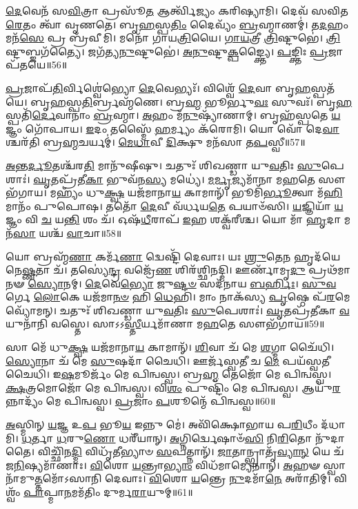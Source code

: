 \-\ul{𑌦𑍇}\-𑌵𑍇𑌨᳴ 𑌸\-\ul{𑌵𑌿}\-𑌤𑍍𑌰𑌾 𑌪𑍍𑌰𑌸𑍂᳴\-\ul{𑌤} 𑌆𑌰𑍍𑌤𑍍𑌵𑌿᳴𑌜𑍍𑌯𑌂 𑌕𑌰𑌿𑌷𑍍𑌯𑌾𑌮𑌿।
𑌦𑍇𑌵᳴ 𑌸𑌵𑌿𑌤\-\ul{𑌰𑍇}\-𑌤𑌂 𑌤𑍍𑌵𑌾᳴ 𑌵𑍃𑌣𑌤𑍇।
𑌬𑍃\-\ul{𑌹}\-𑌸𑍍𑌪\-\ul{𑌤𑌿𑌂} 𑌦𑍈𑌵𑍍𑌯𑌂᳴ \ul{𑌬𑍍𑌰}\-𑌹𑍍𑌮𑌾𑌣𑌮𑍍॑।
𑌤\-\ul{𑌦}\-𑌹𑌂 𑌮𑌨᳴\-\ul{𑌸𑍇} 𑌪𑍍𑌰 𑌬𑍍𑌰᳴𑌵𑍀𑌮𑌿।
𑌮𑌨𑍋᳴ 𑌗𑌾𑌯\-\ul{𑌤𑍍𑌰𑌿}\-𑌯𑍈।
\-\ul{𑌗𑌾}\-\-\ul{𑌯}\-𑌤𑍍𑌰𑍀 \ul{𑌤𑍍𑌰𑌿}\-𑌷𑍍𑌟𑍁𑌭𑍇॑।
\-\ul{𑌤𑍍𑌰𑌿}\-𑌷𑍍𑌟𑍁𑌬𑍍𑌜𑌗᳴𑌤𑍍𑌯𑍈।
𑌜𑌗᳴𑌤𑍍𑌯\-\ul{𑌨𑍁}\-𑌷𑍍𑌟𑍁𑌭𑍇॑।
\-\ul{𑌅}\-\-\ul{𑌨𑍁}\-𑌷𑍍𑌟𑍁\-\ul{𑌕𑍍𑌪}\-𑌙𑍍𑌕𑍍𑌤𑍍𑌯𑍈।
\-\ul{𑌪}\-𑌙𑍍𑌕𑍍𑌤𑌿𑌃 \ul{𑌪𑍍𑌰}\-𑌜𑌾𑌪᳴𑌤𑌯𑍇॥56॥

\-\ul{𑌪𑍍𑌰}\-𑌜𑌾𑌪᳴\-\ul{𑌤𑌿}\-𑌰𑍍𑌵𑌿𑌶𑍍𑌵𑍇॑𑌭𑍍𑌯𑍋 \ul{𑌦𑍇}\-𑌵𑍇𑌭𑍍𑌯𑌃᳴।
𑌵𑌿𑌶𑍍𑌵𑍇᳴ \ul{𑌦𑍇}\-𑌵𑌾 𑌬𑍃\-\ul{𑌹}\-𑌸𑍍𑌪𑌤᳴𑌯𑍇।
𑌬𑍃\-\ul{𑌹}\-𑌸𑍍𑌪\-\ul{𑌤𑌿}\-𑌰𑍍𑌬𑍍𑌰𑌹𑍍𑌮᳴𑌣𑍇।
𑌬𑍍𑌰\-\ul{𑌹𑍍𑌮} 𑌭𑍂𑌰𑍍𑌭𑍁\-\ul{𑌵𑌃} 𑌸𑍁𑌵𑌃᳴।
𑌬𑍃\-\ul{𑌹}\-𑌸𑍍𑌪𑌤𑌿᳴\-\ul{𑌰𑍍𑌦𑍇}\-𑌵𑌾𑌨𑌾𑌂॑ \ul{𑌬𑍍𑌰}\-𑌹𑍍𑌮𑌾।
\-\ul{𑌅}\-𑌹𑌂 𑌮᳴\-\ul{𑌨𑍁}\-𑌷𑍍𑌯𑌾᳴𑌣𑌾𑌮𑍍।
𑌬𑍃𑌹᳴𑌸𑍍𑌪𑌤𑍇 \ul{𑌯}\-𑌜𑍍𑌞𑌂 𑌗𑍋᳴𑌪𑌾𑌯।
\-\ul{𑌇}\-𑌦𑌂 𑌤𑌸𑍍𑌮𑍈᳴ \ul{𑌹}\-𑌰𑍍𑌮𑍍𑌯𑌂 𑌕᳴𑌰𑍋𑌮𑌿।
𑌯𑍋 𑌵𑍋᳴ 𑌦𑍇\-\ul{𑌵𑌾}\-𑌶𑍍𑌚𑌰᳴𑌤𑌿 𑌬𑍍𑌰\-\ul{𑌹𑍍𑌮}\-𑌚𑌰𑍍𑌯𑌮𑍍॑।
\-\ul{𑌮𑍇}\-\-\ul{𑌧𑌾}\-𑌵𑍀 \ul{𑌦𑌿}\-𑌕𑍍𑌷𑍁 𑌮𑌨᳴𑌸𑌾 𑌤\-\ul{𑌪}\-𑌸𑍍𑌵𑍀॥57॥

\-\ul{𑌅}\-𑌨𑍍𑌤\-\ul{𑌰𑍍𑌦𑍂}\-𑌤𑌶𑍍𑌚᳴𑌰\-\ul{𑌤𑌿} 𑌮𑌾𑌨𑍁᳴𑌷𑍀𑌷𑍁।
𑌚𑌤𑍁𑌃᳴ 𑌶𑌿𑌖𑌣𑍍𑌡𑌾 𑌯𑍁\-\ul{𑌵}\-𑌤𑌿𑌃 \ul{𑌸𑍁}\-𑌪𑍇𑌶𑌾𑌃॑।
\-\ul{𑌘𑍃}\-𑌤𑌪𑍍𑌰᳴𑌤𑍀\-\ul{𑌕𑌾} 𑌭𑍁𑌵᳴𑌨\-\ul{𑌸𑍍𑌯} 𑌮𑌧𑍍𑌯𑍇॑।
\-\ul{𑌮}\-\-\ul{𑌰𑍍𑌮𑍃}\-𑌜𑍍𑌯𑌮𑌾᳴𑌨𑌾 𑌮\-\ul{𑌹}\-𑌤𑍇 𑌸𑍗𑌭᳴𑌗𑌾𑌯।
𑌮𑌹𑍍𑌯𑌂᳴ 𑌧𑍁\-\ul{𑌕𑍍𑌷𑍍𑌵} 𑌯𑌜᳴𑌮𑌾𑌨𑌾\-\ul{𑌯} 𑌕𑌾𑌮𑌾𑌨𑍍᳴।
𑌭𑍂𑌮𑌿᳴\-\ul{𑌰𑍍𑌭𑍂}\-𑌤𑍍𑌵𑌾 𑌮᳴\-\ul{𑌹𑌿}\-𑌮𑌾𑌨𑌂᳴ 𑌪𑍁𑌪𑍋𑌷।
𑌤𑌤𑍋᳴ \ul{𑌦𑍇}\-𑌵𑍀 𑌵᳴𑌰𑍍𑌧𑌯\-\ul{𑌤𑍇} 𑌪𑌯𑌾𑍞᳴𑌸𑌿।
\-\ul{𑌯}\-𑌜𑍍𑌞𑌿𑌯𑌾᳴ \ul{𑌯}\-𑌜𑍍𑌞𑌂 𑌵𑌿 \ul{𑌚} 𑌯\-\ul{𑌨𑍍𑌤𑌿} 𑌶𑌂 𑌚᳴।
𑌓𑌷᳴\-\ul{𑌧𑍀}\-𑌰𑌾𑌪᳴ \ul{𑌇}\-𑌹 𑌶𑌕𑍍𑌵᳴𑌰𑍀𑌶𑍍𑌚।
𑌯𑍋 𑌮𑌾᳴ \ul{𑌹𑍃}\-𑌦𑌾 𑌮𑌨᳴\-\ul{𑌸𑌾} 𑌯𑌶𑍍𑌚᳴ \ul{𑌵𑌾}\-𑌚𑌾॥58॥

𑌯𑍋 𑌬𑍍𑌰𑌹𑍍𑌮᳴\-\ul{𑌣𑌾} 𑌕𑌰𑍍𑌮᳴\-\ul{𑌣𑌾} 𑌦𑍍𑌵𑍇𑌷𑍍𑌟𑌿᳴ 𑌦𑍇𑌵𑌾𑌃।
𑌯𑌃 \ul{𑌶𑍍𑌰𑍁}\-𑌤𑍇\-\ul{𑌨} 𑌹𑍃𑌦᳴𑌯𑍇𑌨𑍇\-\ul{𑌷𑍍𑌣}\-𑌤𑌾 𑌚᳴।
𑌤𑌸𑍍𑌯𑍇॑\-\ul{𑌨𑍍𑌦𑍍𑌰} 𑌵𑌜𑍍𑌰𑍇᳴\-\ul{𑌣} 𑌶𑌿𑌰᳴𑌶𑍍𑌛𑌿𑌨𑌦𑍍𑌮𑌿।
𑌊𑌰𑍍𑌣𑌾᳴𑌮𑍃\-\ul{𑌦𑍁} 𑌪𑍍𑌰𑌥᳴𑌮𑌾𑌨𑍟 \ul{𑌸𑍍𑌯𑍋}\-𑌨𑌮𑍍।
\-\ul{𑌦𑍇}\-𑌵𑍇\-\ul{𑌭𑍍𑌯𑍋} 𑌜𑍁\-\ul{𑌷𑍍𑌟}\-\-\ul{𑍞} 𑌸𑌦᳴𑌨𑌾𑌯 \ul{𑌬}\-\-\ul{𑌰𑍍}\-𑌹𑌿𑌃।
\-\ul{𑌸𑍁}\-\-\ul{𑌵}\-𑌰𑍍𑌗𑍇 \ul{𑌲𑍋}\-𑌕𑍇 𑌯𑌜᳴𑌮𑌾\-\ul{𑌨}\-\-\ul{𑍞} 𑌹𑌿 \ul{𑌧𑍇}\-𑌹𑌿।
𑌮𑌾𑌂 𑌨𑌾𑌕᳴𑌸𑍍𑌯 \ul{𑌪𑍃}\-𑌷𑍍𑌠𑍇 𑌪᳴\-\ul{𑌰}\-𑌮𑍇 𑌵𑍍𑌯𑍋᳴𑌮𑌨𑍍।
𑌚𑌤𑍁𑌃᳴ 𑌶𑌿𑌖𑌣𑍍𑌡𑌾 𑌯𑍁\-\ul{𑌵}\-𑌤𑌿𑌃 \ul{𑌸𑍁}\-𑌪𑍇𑌶𑌾𑌃॑।
\-\ul{𑌘𑍃}\-𑌤𑌪𑍍𑌰᳴𑌤𑍀𑌕𑌾 \ul{𑌵}\-𑌯𑍁𑌨𑌾᳴𑌨𑌿 𑌵𑌸𑍍𑌤𑍇।
𑌸𑌾𑌽𑌽\-\ul{𑌸𑍍𑌤𑍀}\-𑌰𑍍𑌯𑌮𑌾᳴𑌣𑌾 𑌮\-\ul{𑌹}\-𑌤𑍇 𑌸𑍗𑌭᳴𑌗𑌾𑌯॥59॥

𑌸𑌾 𑌮𑍇᳴ 𑌧𑍁\-\ul{𑌕𑍍𑌷𑍍𑌵} 𑌯𑌜᳴𑌮𑌾𑌨𑌾\-\ul{𑌯} 𑌕𑌾𑌮𑌾𑌨𑍍᳴।
\-\ul{𑌶𑌿}\-𑌵𑌾 𑌚᳴ 𑌮𑍇 \ul{𑌶}\-𑌗𑍍𑌮𑌾 𑌚𑍈᳴𑌧𑌿।
\-\ul{𑌸𑍍𑌯𑍋}\-𑌨𑌾 𑌚᳴ 𑌮𑍇 \ul{𑌸𑍁}\-𑌷𑌦𑌾᳴ 𑌚𑍈𑌧𑌿।
𑌊𑌰𑍍𑌜᳴𑌸𑍍𑌵𑌤𑍀 𑌚 \ul{𑌮𑍇} 𑌪𑌯᳴𑌸𑍍𑌵𑌤𑍀 𑌚𑍈𑌧𑌿।
𑌇\-\ul{𑌷}\-𑌮𑍂𑌰𑍍𑌜𑌂᳴ 𑌮𑍇 𑌪𑌿𑌨𑍍𑌵𑌸𑍍𑌵।
𑌬𑍍𑌰\-\ul{𑌹𑍍𑌮} 𑌤𑍇𑌜𑍋᳴ 𑌮𑍇 𑌪𑌿𑌨𑍍𑌵𑌸𑍍𑌵।
\-\ul{𑌕𑍍𑌷}\-𑌤𑍍𑌰𑌮𑍋𑌜𑍋᳴ 𑌮𑍇 𑌪𑌿𑌨𑍍𑌵𑌸𑍍𑌵।
𑌵𑌿\-\ul{𑌶𑌂} 𑌪𑍁𑌷𑍍𑌟𑌿𑌂᳴ 𑌮𑍇 𑌪𑌿𑌨𑍍𑌵𑌸𑍍𑌵।
𑌆𑌯𑍁᳴\-\ul{𑌰}\-𑌨𑍍𑌨𑌾𑌦𑍍𑌯𑌂᳴ 𑌮𑍇 𑌪𑌿𑌨𑍍𑌵𑌸𑍍𑌵।
\-\ul{𑌪𑍍𑌰}\-𑌜𑌾𑌂 \ul{𑌪}\-𑌶𑍂𑌨𑍍𑌮𑍇᳴ 𑌪𑌿𑌨𑍍𑌵𑌸𑍍𑌵॥60॥

\-\ul{𑌅}\-𑌸𑍍𑌮𑌿𑌨𑍍 \ul{𑌯}\-𑌜𑍍𑌞 𑌉\-\ul{𑌪} 𑌭𑍂\-\ul{𑌯} 𑌇𑌨𑍍𑌨𑍁 𑌮𑍇॑।
𑌅𑌵𑌿᳴𑌕𑍍𑌷𑍋𑌭𑌾𑌯 𑌪\-\ul{𑌰𑌿}\-𑌧𑍀𑌂 𑌦᳴𑌧𑌾𑌮𑌿।
\-\ul{𑌧}\-𑌰𑍍𑌤𑌾 \ul{𑌧}\-𑌰𑍁\-\ul{𑌣𑍋} 𑌧𑌰𑍀᳴𑌯𑌾𑌨𑍍।
\-\ul{𑌅}\-𑌗𑍍𑌨𑌿𑌰𑍍𑌦𑍍𑌵𑍇𑌷𑌾𑍞᳴\-\ul{𑌸𑌿} 𑌨𑌿\-\ul{𑌰𑌿}\-𑌤𑍋 𑌨𑍁᳴𑌦𑌾𑌤𑍈।
𑌵𑌿𑌚𑍍𑌛𑌿᳴𑌨\-\ul{𑌦𑍍𑌮𑌿} 𑌵𑌿𑌧𑍃᳴𑌤𑍀𑌭𑍍𑌯𑌾𑍞 \ul{𑌸}\-𑌪𑌤𑍍𑌨𑌾𑌨𑍍᳴।
\-\ul{𑌜𑌾}\-𑌤𑌾𑌨𑍍𑌭𑍍𑌰𑌾𑌤𑍃᳴\-\ul{𑌵𑍍𑌯𑌾}\-\-\ul{𑌨𑍍} 𑌯𑍇 𑌚᳴ 𑌜\-\ul{𑌨𑌿}\-𑌷𑍍𑌯𑌮𑌾᳴𑌣𑌾𑌃।
\-\ul{𑌵𑌿}\-𑌶𑍋 \ul{𑌯}\-𑌨𑍍𑌤𑍍𑌰𑌾\-\ul{𑌭𑍍𑌯𑌾𑌂} 𑌵𑌿𑌧᳴𑌮𑌾𑌮𑍍𑌯𑍇𑌨𑌾𑌨𑍍।
\-\ul{𑌅}\-𑌹𑍟 𑌸𑍍𑌵𑌾𑌨𑌾᳴𑌮𑍁\-\ul{𑌤𑍍𑌤}\-𑌮𑍋᳴\-𑌽𑌸𑌾𑌨𑌿 𑌦𑍇𑌵𑌾𑌃।
\-\ul{𑌵𑌿}\-𑌶𑍋 \ul{𑌯}\-𑌨𑍍𑌤𑍍𑌰𑍇 \ul{𑌨𑍁}\-𑌦𑌮𑌾᳴\-\ul{𑌨𑍇} 𑌅𑌰𑌾᳴𑌤𑌿𑌮𑍍।
𑌵𑌿𑌶𑍍𑌵𑌂᳴ \ul{𑌪𑌾}\-𑌪𑍍𑌮𑌾\-\ul{𑌨}\-𑌮𑌮᳴𑌤𑌿𑌂 𑌦𑍁𑌰𑍍𑌮\-\ul{𑌰𑌾}\-𑌯𑍁𑌮𑍍॥61॥

